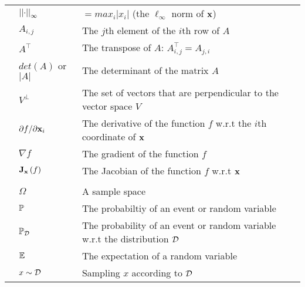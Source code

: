 \begin{table}[h!]
\begin{center}
\begin{tabular}{l|l|l}
			&$\left|\left| \cdot\right|\right|_\infty$& $=max_i \left| x_i\right|$ (the $\ell_\infty$ norm of $\mathbf{x}$)\\
			&$A_{i,j}$& The $j$th element of the $i$th row of $A$\\
			&$A^\top$ & The transpose of $A$: $A^\top_{i,j} = A_{j,i}$\\
			&$det\left(A\right)$ or $\left| A\right|$& The determinant of the matrix $A$\\
			&$V^\perp$&The set of vectors that are perpendicular to the vector space $V$\\
			&$\partial f/ \partial \mathbf{x}_i$& The derivative of the function $f$ w.r.t the $i$th coordinate of $\mathbf{x}$\\
			&$\nabla f$& The gradient of the function $f$\\
			&$\mathbf{J}_{\mathbf{x}}\left(f\right)$& The Jacobian of the function $f$ w.r.t $\mathbf{x}$\\
			&&\\
			&$\Omega$& A sample space\\
			&$\mathbb{P}$& The probabiltiy of an event or random variable\\
			&$\mathbb{P}_{\mathcal{D}}$& The probability of an event or random variable w.r.t the distribution $\mathcal{D}$\\
			&$\mathbb{E}$& The expectation of a random variable\\
			&$x\sim\mathcal{D}$& Sampling $x$ according to $\mathcal{D}$\\
			\hline
		\end{tabular}
	\end{center}
\end{table}

